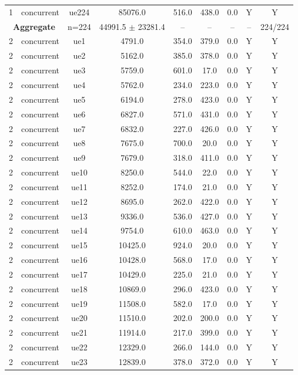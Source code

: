\begin{table}[ht]
\begin{tabular}{|c|c|c|c|c|c|c|c|c|}
1 & concurrent & ue224 & 85076.0 & 516.0 & 438.0 & 0.0 & Y & Y \\
\multicolumn{2}{|c|}{\textbf{Aggregate}} & n=224 & 44991.5 $\pm$ 23281.4 & -- & -- & -- & -- & 224/224 \\
\hline
2 & concurrent & ue1 & 4791.0 & 354.0 & 379.0 & 0.0 & Y & Y \\
2 & concurrent & ue2 & 5162.0 & 385.0 & 378.0 & 0.0 & Y & Y \\
2 & concurrent & ue3 & 5759.0 & 601.0 & 17.0 & 0.0 & Y & Y \\
2 & concurrent & ue4 & 5762.0 & 234.0 & 223.0 & 0.0 & Y & Y \\
2 & concurrent & ue5 & 6194.0 & 278.0 & 423.0 & 0.0 & Y & Y \\
2 & concurrent & ue6 & 6827.0 & 571.0 & 431.0 & 0.0 & Y & Y \\
2 & concurrent & ue7 & 6832.0 & 227.0 & 426.0 & 0.0 & Y & Y \\
2 & concurrent & ue8 & 7675.0 & 700.0 & 20.0 & 0.0 & Y & Y \\
2 & concurrent & ue9 & 7679.0 & 318.0 & 411.0 & 0.0 & Y & Y \\
2 & concurrent & ue10 & 8250.0 & 544.0 & 22.0 & 0.0 & Y & Y \\
2 & concurrent & ue11 & 8252.0 & 174.0 & 21.0 & 0.0 & Y & Y \\
2 & concurrent & ue12 & 8695.0 & 262.0 & 422.0 & 0.0 & Y & Y \\
2 & concurrent & ue13 & 9336.0 & 536.0 & 427.0 & 0.0 & Y & Y \\
2 & concurrent & ue14 & 9754.0 & 610.0 & 463.0 & 0.0 & Y & Y \\
2 & concurrent & ue15 & 10425.0 & 924.0 & 20.0 & 0.0 & Y & Y \\
2 & concurrent & ue16 & 10428.0 & 568.0 & 17.0 & 0.0 & Y & Y \\
2 & concurrent & ue17 & 10429.0 & 225.0 & 21.0 & 0.0 & Y & Y \\
2 & concurrent & ue18 & 10869.0 & 296.0 & 423.0 & 0.0 & Y & Y \\
2 & concurrent & ue19 & 11508.0 & 582.0 & 17.0 & 0.0 & Y & Y \\
2 & concurrent & ue20 & 11510.0 & 202.0 & 200.0 & 0.0 & Y & Y \\
2 & concurrent & ue21 & 11914.0 & 217.0 & 399.0 & 0.0 & Y & Y \\
2 & concurrent & ue22 & 12329.0 & 266.0 & 144.0 & 0.0 & Y & Y \\
2 & concurrent & ue23 & 12839.0 & 378.0 & 372.0 & 0.0 & Y & Y \\

\end{tabular}
\end{table}
